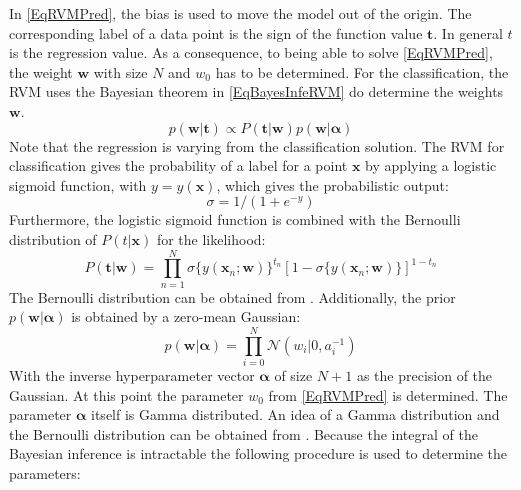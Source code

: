 In \eqref{EqRVMPred}, the bias is used to move the model out of the origin.
The corresponding label of a data point is the sign of the function value $\mathbf{t}$.
In general $t$ is the regression value. \cite[p. 662]{Theodoridis.2015} \newline
As a consequence, to being able to solve \eqref{EqRVMPred}, the weight $\mathbf{w}$ with size $N$ and $w_0$ has to be determined.
For the classification, the \acs{RVM} uses the Bayesian theorem in \eqref{EqBayesInfeRVM} do determine the weights $\mathbf{w}$. 
\begin{equation}\label{EqBayesInfeRVM}
p( \mathbf{w}\vert \mathbf{t} ) \propto P(\mathbf{t}\vert \mathbf{w}) p(\mathbf{w} \vert \boldsymbol{\alpha})
\end{equation}
Note that the regression is varying from the classification solution.
The \ac{RVM} for classification gives the probability of a label for a point $\mathbf{x}$ by applying a logistic sigmoid function, with $y=y(\mathbf{x})$, which gives the probabilistic output:
\begin{equation}\label{EqLogSig}
\sigma=1/(1+e^{-y}) 
\end{equation}
Furthermore, the logistic sigmoid function is combined with the Bernoulli distribution of $P(t\vert \mathbf{x})$ for the likelihood:
\begin{equation}\label{EqRVMLikelihood}
P(\mathbf{t}\vert\mathbf{w})=\prod_{n=1}^{N}\sigma\{y(\mathbf{x}_n;\mathbf{w})\}^{t_n}[1-\sigma\{y(\mathbf{x}_n;\mathbf{w})\}]^{1-t_n}
\end{equation}
The Bernoulli distribution can be obtained from \cite[p. 685]{Bishop.2009} .
Additionally, the prior $p(\mathbf{w} \vert \boldsymbol{\alpha})$ is obtained by a zero-mean Gaussian:
\begin{equation}\label{EqRVMPrior}
p(\mathbf{w} \vert \boldsymbol{\alpha}) = \prod_{i=0}^{N}\mathcal{N}(w_i\vert 0,a_i^{-1})
\end{equation}
With the inverse hyperparameter vector $\boldsymbol{\alpha}$ of size $N+1$ as the precision of the Gaussian.
At this point the parameter $w_0$ from \eqref{EqRVMPred} is determined.
The parameter $\boldsymbol{\alpha}$ itself is Gamma distributed.\cite[p. 214-215, 218-219]{Tipping.2001}\newline
An idea of a Gamma distribution and the Bernoulli distribution can be obtained from \cite[p.686-688]{Bishop.2009}.\newline
Because the integral of the Bayesian inference is intractable the following procedure is used to determine the parameters:
